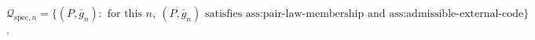 \(\mathcal Q_{\mathrm{spec},n}=\{(P,\bar g_n):\text{ for this }n,\ (P,\bar g_n)\text{ satisfies }\text{ass:pair-law-membership}\text{ and }\text{ass:admissible-external-code}\}\).